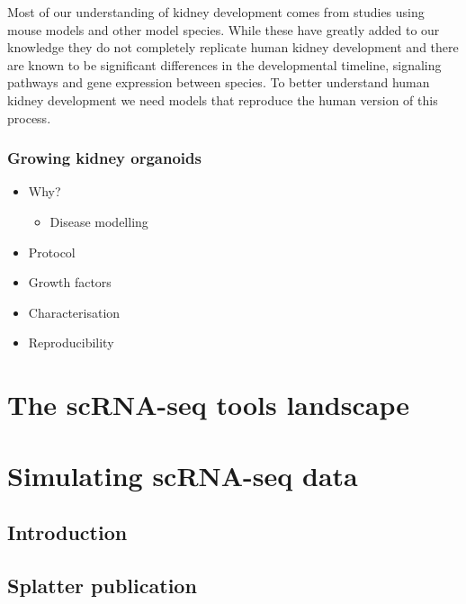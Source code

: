 \documentclass[11pt,a4paper,titlepage,twoside,openright]{style/unimelbthesis}
\theoremstyle{definition}
\theoremstyle{definition}
\theoremstyle{definition}
\theoremstyle{remark}
\begin{document}
\begin{mainmatter}
Most of our understanding of kidney development comes from studies using mouse models and other model species. While these have greatly added to our knowledge they do not completely replicate human kidney development and there are known to be significant differences in the developmental timeline, signaling pathways and gene expression between species. To better understand human kidney development we need models that reproduce the human version of this process.

\hypertarget{growing-kidney-organoids}{%
\subsection{Growing kidney organoids}\label{growing-kidney-organoids}}

\begin{itemize}
\tightlist
\item
  Why?

  \begin{itemize}
  \tightlist
  \item
    Disease modelling
  \end{itemize}
\item
  Protocol
\item
  Growth factors
\item
  Characterisation
\item
  Reproducibility
\end{itemize}

\hypertarget{the-scrna-seq-tools-landscape}{%
\chapter{The scRNA-seq tools landscape}\label{the-scrna-seq-tools-landscape}}

\hypertarget{simulating-scrna-seq-data}{%
\chapter{Simulating scRNA-seq data}\label{simulating-scrna-seq-data}}

\hypertarget{introduction-1}{%
\section{Introduction}\label{introduction-1}}

\hypertarget{splatter-publication}{%
\section{Splatter publication}\label{splatter-publication}}


\end{mainmatter}
\end{document}
